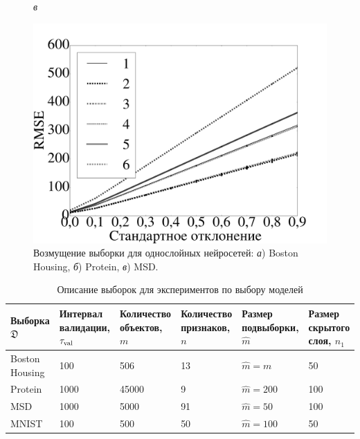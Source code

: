 \begin{figure}[tbh!]
\endminipage\hfill
{}%
\caption*{\textit{в}}
\includegraphics[width=1.0\textwidth]{./plots/var/msd/rmse_data2.pdf}

\endminipage
\caption{ Возмущение выборки для однослойных нейросетей: \textit{а}) Boston Housing, \textit{б}) Protein, \textit{в}) MSD.
}
\label{fig:noise_in_data}
\end{figure}




\begin{table}[!htbp]
\captionsetup{justification=raggedright,singlelinecheck=false}
\label{table1}
\caption{Описание выборок для экспериментов  по выбору моделей}
\footnotesize
\centering

\begin{tabular}{ | p{2cm} |p{2cm} | p{2cm} | p{2cm} | p{2cm} | p{2cm} | }
\hline
Выборка $\mathfrak{D}$ & Интервал валидации, $\tau_\textnormal{val}$ & Количество объектов, $m$ & Количество признаков, $n$ & Размер подвыборки, $\hat{m}$ &  Размер скрытого слоя, $n_1$ \\
\hline
Boston Housing & 100 & 506 & 13 & $\hat{m} = m$ & 50 \\
\hline
Protein & 1000 & 45000 & 9 & $\hat{m} = 200$ & 100 \\
\hline
MSD & 1000& 5000 & 91 & $\hat{m} = 50$ & 100\\
\hline
MNIST & 100  & 500 & 50 & $\hat{m} = 100$ & 50\\ 
\hline
\end{tabular}
\end{table}


\newcommand{\specialcell}[2][c]{%
  \begin{tabular}[#1]{@{}c@{}}#2\end{tabular}}


